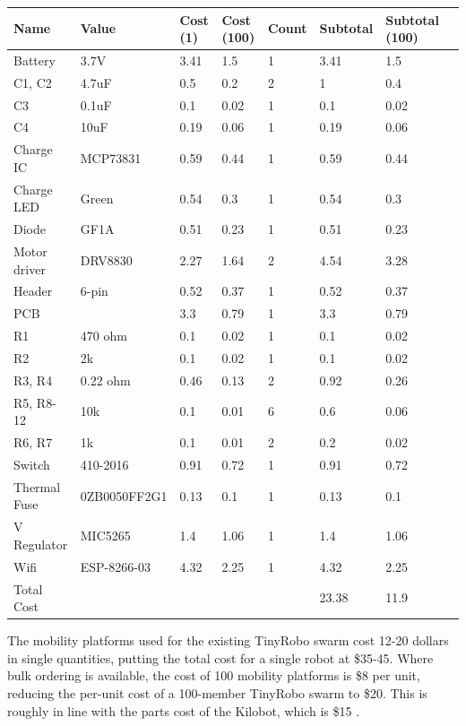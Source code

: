 \begin{table}
	\begin{tabular}{l l l l l l l l }
		Name & Value & Cost (1) & Cost (100) & Count & Subtotal & Subtotal (100)\\
		\hline
		Battery & 3.7V & 3.41 & 1.5 & 1 & 3.41 & 1.5\\
		C1, C2 & 4.7uF & 0.5 & 0.2 & 2 & 1 & 0.4\\
		C3 & 0.1uF & 0.1 & 0.02 & 1 & 0.1 & 0.02\\
		C4 & 10uF & 0.19 & 0.06 & 1 & 0.19 & 0.06\\
		Charge IC & MCP73831 & 0.59 & 0.44 & 1 & 0.59 & 0.44\\
		Charge LED & Green & 0.54 & 0.3 & 1 & 0.54 & 0.3\\
		Diode & GF1A & 0.51 & 0.23 & 1 & 0.51 & 0.23\\
		Motor driver & DRV8830 & 2.27 & 1.64 & 2 & 4.54 & 3.28\\
		Header & 6-pin  & 0.52 & 0.37 & 1 & 0.52 & 0.37\\
		PCB &  & 3.3 & 0.79 & 1 & 3.3 & 0.79\\
		R1 & 470 ohm & 0.1 & 0.02 & 1 & 0.1 & 0.02\\
		R2 & 2k & 0.1 & 0.02 & 1 & 0.1 & 0.02\\
		R3, R4 & 0.22 ohm & 0.46 & 0.13 & 2 & 0.92 & 0.26\\
		R5, R8-12 & 10k & 0.1 & 0.01 & 6 & 0.6 & 0.06\\
		R6, R7 & 1k & 0.1 & 0.01 & 2 & 0.2 & 0.02\\
		Switch & 410-2016 & 0.91 & 0.72 & 1 & 0.91 & 0.72\\
		Thermal Fuse & 0ZB0050FF2G1 & 0.13 & 0.1 & 1 & 0.13 & 0.1\\
		V Regulator & MIC5265 & 1.4 & 1.06 & 1 & 1.4 & 1.06\\
		Wifi & ESP-8266-03 & 4.32 & 2.25 & 1 & 4.32 & 2.25\\
		\hline
		Total Cost &  &  &  &  & 23.38 & 11.9\\
	\end{tabular}
\end{table}

The mobility platforms used for the existing TinyRobo swarm cost 12-20 dollars in single quantities, putting the total cost for a single robot at \$35-45.
Where bulk ordering is available, the cost of 100 mobility platforms is \$8 per unit, reducing the per-unit cost of a 100-member TinyRobo swarm to \$20. 
This is roughly in line with the parts cost of the Kilobot, which is \$15 \citep{rubenstein2014kilobot}.

